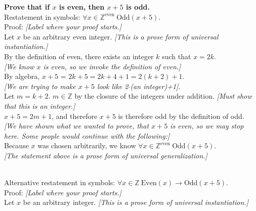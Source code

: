 \documentclass[10pt]{article}
\newcommand{\Z}{\mathbb{Z}}
\begin{document}
\textbf{Prove that if $x$ is even, then $x+5$ is odd.}
\\

Restatement in symbols: $\forall x \in \Z^{\textrm{even}} \ \textrm{Odd}(x+5)$.
\\

Proof: \hfill \textit{[Label where your proof starts.]} \\

Let $x$ be an arbitrary even integer. \hfill \textit{[This is a prose form of universal instantiation.]}\\

By the definition of even, there exists an integer $k$ such that $x=2k$.
\\ \phantom{.} \hfill \textit{[We know $x$ is even, so we invoke the definition of even.]}\\

By algebra, $x+5$ = $2k+5 = 2k+4 +1 = 2(k+2)+1$. \\ \phantom{.} \hfill \textit{[We are trying to make $x+5$ look like 2$\cdot$(an integer)+1]}.\\

Let $m=k+2$.  $m \in \Z$ by the closure of the integers under addition. \hfill \textit{[Must show that this is an integer.]}\\

$x+5=2m+1$, and therefore $x+5$ is therefore odd by the definition of odd. \\

\textit{[We have shown what we wanted to prove, that $x+5$ is even, so we may stop here.  Some people would continue with the following:]}\\

Because $x$ was chosen arbitrarily, we know $\forall x \in \Z^{\textrm{even}} \ \textrm{Odd}(x+5)$. \\

\textit{[The statement above is a prose form of universal generalization.]}

\noindent\makebox[\linewidth]{\rule{\textwidth}{0.4pt}} \\



Alternative restatement in symbols: $\forall x \in \Z \ \textrm{Even}(x)  \to \textrm{Odd}(x+5)$.
\\

Proof: \hfill \textit{[Label where your proof starts.]} \\

Let $x$  be an arbitrary integer. \hfill \textit{[This is a prose form of universal instantiation.]}\\
\end{document}
